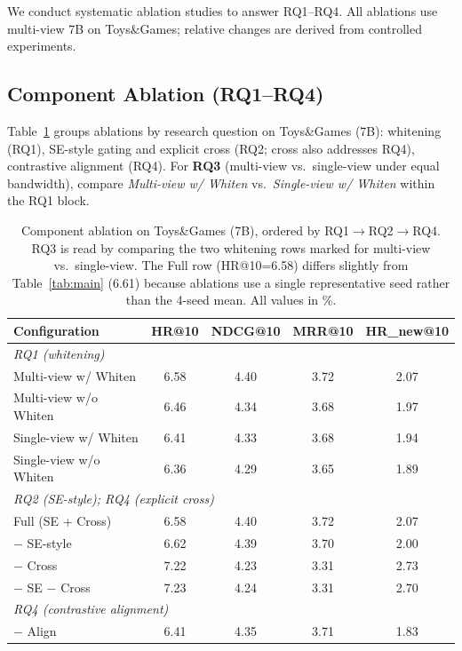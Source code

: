 \documentclass[sigconf,natbib=true,anonymous]{acmart}
\begin{document}
We conduct systematic ablation studies to answer RQ1--RQ4.
All ablations use multi-view 7B on Toys\&Games; relative changes
are derived from controlled experiments.
\subsection{Component Ablation (RQ1--RQ4)}

Table~\ref{tab:ablation} groups ablations by research question on
Toys\&Games (7B): whitening (RQ1), SE-style gating and explicit cross
(RQ2; cross also addresses RQ4), contrastive alignment (RQ4).
For \textbf{RQ3} (multi-view vs.\ single-view under equal bandwidth),
compare \emph{Multi-view w/ Whiten} vs.\ \emph{Single-view w/ Whiten}
within the RQ1 block.

\begin{table}[t]
\caption{Component ablation on Toys\&Games (7B), ordered by RQ1$\rightarrow$RQ2$\rightarrow$RQ4.
RQ3 is read by comparing the two whitening rows marked for multi-view vs.\ single-view.
The Full row (HR@10=6.58) differs slightly from Table~\ref{tab:main} (6.61) because ablations use a single representative seed rather than the 4-seed mean.
All values in \%.}
\label{tab:ablation}
\centering
\scriptsize
\begin{tabular}{@{}lcccc@{}}
\toprule
\textbf{Configuration} & HR@10 & NDCG@10 & MRR@10 & HR\_new@10 \\
\midrule
\multicolumn{5}{l}{\textit{RQ1 (whitening)}} \\
Multi-view w/ Whiten & 6.58 & 4.40 & 3.72 & 2.07 \\
Multi-view w/o Whiten & 6.46 & 4.34 & 3.68 & 1.97 \\
Single-view w/ Whiten & 6.41 & 4.33 & 3.68 & 1.94 \\
Single-view w/o Whiten & 6.36 & 4.29 & 3.65 & 1.89 \\
\midrule
\multicolumn{5}{l}{\textit{RQ2 (SE-style); RQ4 (explicit cross)}} \\
Full (SE + Cross) & 6.58 & 4.40 & 3.72 & 2.07 \\
$-$ SE-style & 6.62 & 4.39 & 3.70 & 2.00 \\
$-$ Cross & 7.22 & 4.23 & 3.31 & 2.73 \\
$-$ SE $-$ Cross & 7.23 & 4.24 & 3.31 & 2.70 \\
\midrule
\multicolumn{5}{l}{\textit{RQ4 (contrastive alignment)}} \\
$-$ Align & 6.41 & 4.35 & 3.71 & 1.83 \\
\bottomrule
\end{tabular}
\end{table}
\end{document}
